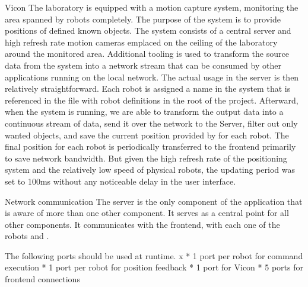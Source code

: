 \secc Vicon
The laboratory is equipped with a {\vicon} motion capture system, monitoring the area spanned by robots completely. The purpose of the system is to provide positions of defined known objects.\br
The system consists of a central server and high refresh rate motion cameras emplaced on the ceiling of the laboratory around the monitored area. Additional tooling is used to transform the source data from the {\vicon} system into a network stream that can be consumed by other applications running on the local network.\br
The actual usage in the server is then relatively straightforward. Each robot is assigned a name in the {\vicon} system that is referenced in the file with robot definitions in the root of the project. Afterward, when the {\vicon} system is running, we are able to transform the output data into a continuous stream of data, send it over the network to the Server, filter out only wanted objects, and save the current position provided by {\vicon} for each robot. The final position for each robot is periodically transferred to the frontend primarily to save network bandwidth. But given the high refresh rate of the positioning system and the relatively low speed of physical robots, the updating period was set to 100ms without any noticeable delay in the user interface.

\secc Network communication
The server is the only component of the application that is aware of more than one other component. It serves as a central point for all other components. It communicates with the frontend, with each one of the robots and {\vicon}.

The following ports should be used at runtime.
\begitems \style x
    * 1 port per robot for command execution
    * 1 port per robot for position feedback
    * 1 port for Vicon
    * 5 ports for frontend connections
\enditems

